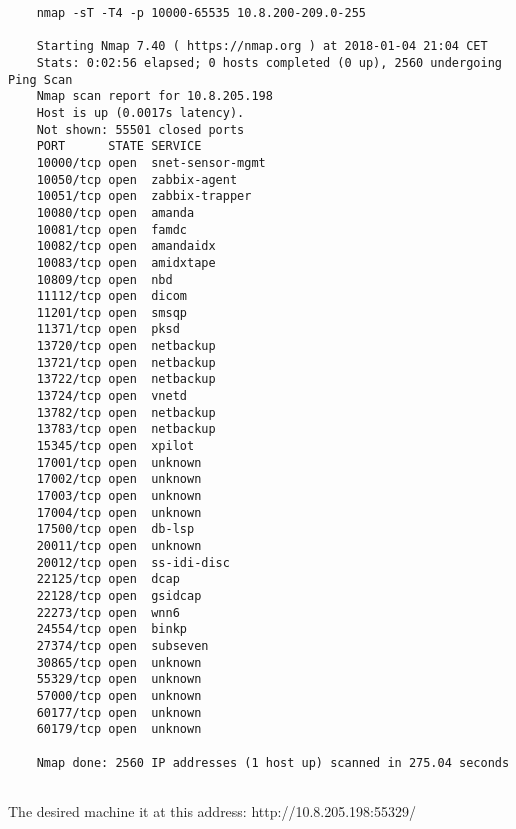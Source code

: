 \begin{lstlisting}
	nmap -sT -T4 -p 10000-65535 10.8.200-209.0-255
	
	Starting Nmap 7.40 ( https://nmap.org ) at 2018-01-04 21:04 CET
	Stats: 0:02:56 elapsed; 0 hosts completed (0 up), 2560 undergoing Ping Scan
	Nmap scan report for 10.8.205.198
	Host is up (0.0017s latency).
	Not shown: 55501 closed ports
	PORT      STATE SERVICE
	10000/tcp open  snet-sensor-mgmt
	10050/tcp open  zabbix-agent
	10051/tcp open  zabbix-trapper
	10080/tcp open  amanda
	10081/tcp open  famdc
	10082/tcp open  amandaidx
	10083/tcp open  amidxtape
	10809/tcp open  nbd
	11112/tcp open  dicom
	11201/tcp open  smsqp
	11371/tcp open  pksd
	13720/tcp open  netbackup
	13721/tcp open  netbackup
	13722/tcp open  netbackup
	13724/tcp open  vnetd
	13782/tcp open  netbackup
	13783/tcp open  netbackup
	15345/tcp open  xpilot
	17001/tcp open  unknown
	17002/tcp open  unknown
	17003/tcp open  unknown
	17004/tcp open  unknown
	17500/tcp open  db-lsp
	20011/tcp open  unknown
	20012/tcp open  ss-idi-disc
	22125/tcp open  dcap
	22128/tcp open  gsidcap
	22273/tcp open  wnn6
	24554/tcp open  binkp
	27374/tcp open  subseven
	30865/tcp open  unknown
	55329/tcp open  unknown
	57000/tcp open  unknown
	60177/tcp open  unknown
	60179/tcp open  unknown
	
	Nmap done: 2560 IP addresses (1 host up) scanned in 275.04 seconds
	
\end{lstlisting}

The desired machine it at this address: http://10.8.205.198:55329/